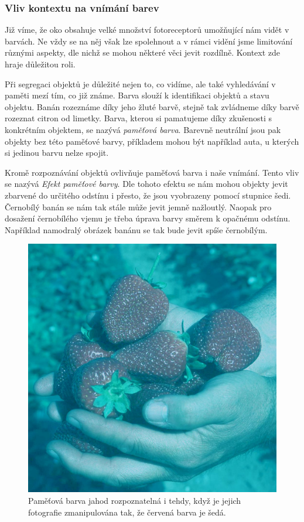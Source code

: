 
\subsubsection{Vliv kontextu na vnímání barev}
Již víme, že oko obsahuje velké množství fotoreceptorů umožňující nám vidět v barvách. Ne vždy se na něj však lze spolehnout a v rámci vidění jsme limitování různými aspekty,
dle nichž se mohou některé věci jevit rozdílně. Kontext zde hraje důležitou roli.

Při segregaci objektů je důležité nejen to, co vidíme, ale také vyhledávání v paměti mezí tím, co již známe.
Barva slouží k identifikaci objektů a stavu objektu. Banán rozeznáme díky jeho žluté barvě, stejně tak zvládneme díky barvě
rozeznat citron od limetky. Barva, kterou si pamatujeme díky zkušenosti s konkrétním objektem, se nazývá \emph{paměťová barva}.
Barevně neutrální jsou pak objekty bez této paměťové barvy, příkladem mohou být například auta, u kterých si jedinou barvu nelze spojit.

Kromě rozpoznávání objektů ovlivňuje paměťová barva i naše vnímání. Tento vliv se nazývá \emph{Efekt paměťové barvy}. Dle tohoto efektu se nám
mohou objekty jevit zbarvené do určitého odstínu i přesto, že jsou vyobrazeny pomocí stupnice šedi. Černobílý banán se nám tak stále může jevit jemně
nažloutlý. Naopak pro dosažení černobílého vjemu je třeba úprava barvy směrem k opačnému odstínu. Například namodralý obrázek banánu se tak bude jevit
spíše černobílým.

\begin{figure}[!ht]
    \centering
    \includegraphics[width=0.35\linewidth]{images/Strawberries_memory_colour.jpg}
    \caption{Paměťová barva jahod rozpoznatelná i tehdy, když je jejich fotografie zmanipulována tak, že červená barva je šedá.~\cite{memory-colour-strawberries}}
    \label{fig: Paměťová barva}
\end{figure}


